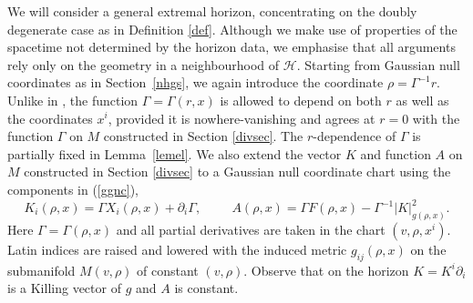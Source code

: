 \documentclass[11pt, reqno]{amsart}
\theoremstyle{plain}
\theoremstyle{definition}
\numberwithin{equation}{section}
\begin{document}
We will consider a general extremal horizon, concentrating on the doubly degenerate case as in Definition \ref{def}. Although we make use of properties of the spacetime not determined by the horizon data, we emphasise that all arguments rely only on the geometry in a neighbourhood of $\mathcal{H}$. Starting from Gaussian null coordinates as in Section~\ref{nhgs}, we again introduce the coordinate $\rho = \Gamma^{-1}r$. Unlike in \cite{LR12}, the function $\Gamma = \Gamma(r,x)$ is allowed to depend on both $r$ as well as the coordinates $x^i$, provided it is nowhere-vanishing and agrees at $r = 0$ with the function $\Gamma$ on $M$ constructed in Section \ref{divsec}. The $r$-dependence of $\Gamma$ is partially fixed in Lemma~\ref{lemel}. We also extend the vector $K$ and function $A$ on $M$ constructed in Section \ref{divsec} to a Gaussian null coordinate chart using the components in (\ref{ggnc}), 
\begin{equation} \label{KAext}
      K_i(\rho,x) = \Gamma X_i(\rho,x) + \partial_i\Gamma, \hspace{1cm}   A(\rho,x) = \Gamma F(\rho,x) - \Gamma^{-1}\vert K \vert^2_{g(\rho,x)}.
\end{equation}
Here $\Gamma = \Gamma(\rho,x)$ and all partial derivatives are taken in the chart $(v,\rho,x^i)$. Latin indices are raised and lowered with the induced metric $g_{ij}(\rho,x)$ on the submanifold $M(v,\rho)$ of constant $(v,\rho)$. Observe that on the horizon $K = K^i\partial_i$ is a Killing vector of $g$ and $A$ is constant. 
\end{document}
